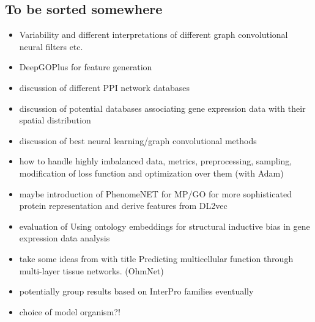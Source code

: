 \documentclass[]{article}
\renewcommand{\cite}{\citep}
\begin{document}
\subsection*{To be sorted somewhere}
\begin{itemize}
	\item Variability and different interpretations of different graph convolutional neural filters \cite{GCNConv, GENConv2020, feng2022kergnns} etc.
	
	
	\item DeepGOPlus for feature generation \cite{DeepGoPlus}
	\item discussion of different PPI network databases \cite{STRINGv10}
	\item discussion of potential databases associating gene expression data with their spatial distribution \cite{hawrylycz_digital_2011}
	\item discussion of best neural learning/graph convolutional methods \cite{Pytorch, PytorchGeometric}
	\item how to handle highly imbalanced data, metrics, preprocessing, sampling, modification of loss function \cite{Jeni2013} and optimization over them (with Adam\cite{Adam2014})
	\item maybe introduction of PhenomeNET for MP/GO for more sophisticated protein representation \cite{PhenomeNET2011, GOoriginal2000, GOrecent2020, MP2009} and derive features from DL2vec \cite{DL2vec2020, Word2vec2013}
	\item evaluation of \glqq Using ontology embeddings for structural inductive bias in gene expression data analysis\grqq{}\cite{Trebacz2020}
	\item take some ideas from \citet{Zitnik2017} with title \glqq Predicting multicellular function through multi-layer tissue networks\grqq{}. (OhmNet)
	\item potentially group results based on InterPro\cite{Interpro2020} families eventually
	
	\item choice of model organism?!
\end{itemize}


\newpage
\end{document}
